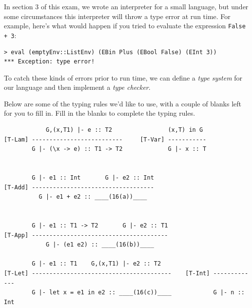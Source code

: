 \documentclass[addpoints]{exam}
\begin{document}
\begin{questions}
\newpage

\question In section 3 of this exam, we wrote an interpreter for a small language, but under some circumstances this interpreter will throw a type error at run time.  For example, here's what would happen if you tried to evaluate the expression \verb|False + 3|:

\begin{verbatim}
> eval (emptyEnv::ListEnv) (EBin Plus (EBool False) (EInt 3))
*** Exception: type error!
\end{verbatim}

To catch these kinds of errors prior to run time, we can define a \emph{type system} for our language and then implement a \emph{type checker}.

Below are some of the typing rules we'd like to use, with a couple of blanks left for you to fill in.  Fill in the blanks to complete the typing rules.

{\small
\begin{verbatim}
            G,(x,T1) |- e :: T2                (x,T) in G                
[T-Lam] --------------------------     [T-Var] -----------
        G |- (\x -> e) :: T1 -> T2             G |- x :: T


        G |- e1 :: Int       G |- e2 :: Int
[T-Add] -----------------------------------
          G |- e1 + e2 :: ____(16(a))____


        G |- e1 :: T1 -> T2       G |- e2 :: T1  
[T-App] ---------------------------------------
            G |- (e1 e2) :: ____(16(b))____
                             
        G |- e1 :: T1    G,(x,T1) |- e2 :: T2
[T-Let] ----------------------------------------    [T-Int] -------------
        G |- let x = e1 in e2 :: ____(16(c))____            G |- n :: Int
\end{verbatim}
}

\end{questions}
\end{document}

